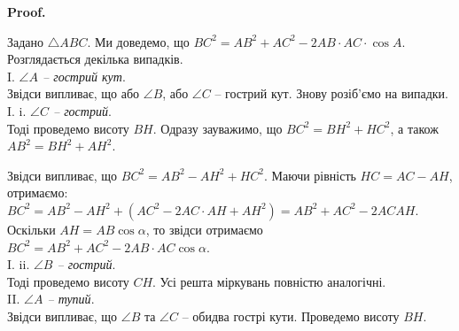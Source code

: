 \documentclass[a4paper, 10pt]{article}
\makeatletter
\theoremstyle{theoremdd}
\theoremstyle{theoremdd}
\theoremstyle{theoremdd}
\theoremstyle{theoremdd}
\theoremstyle{theoremdd}
\theoremstyle{theoremdd}
\theoremstyle{theoremdd}
\theoremstyle{theoremdd}
\theoremstyle{theoremdd}
\renewenvironment{proof}[1][Proof.\\]{\par
\pushQED{\hfill \qed}%
\normalfont \topsep6\p@\@plus6\p@\relax
\trivlist
\item\relax
{\bfseries
#1\@addpunct{.}}\hspace\labelsep\ignorespaces
}{%
\popQED\endtrivlist\@endpefalse
}
\makeatother
\begin{document}
\begin{proof}
Задано $\triangle ABC$. Ми доведемо, що $BC^2 = AB^2 + AC^2 - 2 AB \cdot AC \cdot \cos A$. Розглядається декілька випадків.
\bigskip \\
I. \textit{$\angle A$ -- гострий кут}.\\
Звідси випливає, що або $\angle B$, або $\angle C$ -- гострий кут. Знову розіб'ємо на випадки.\\
I. i. \textit{$\angle C$ -- гострий}.\\
Тоді проведемо висоту $BH$. Одразу зауважимо, що $BC^2 = BH^2 + HC^2$, а також $AB^2 = BH^2 + AH^2$.
\begin{figure}[H]
\centering
{}
\end{figure}
Звідси випливає, що $BC^2 = AB^2 - AH^2 + HC^2$. Маючи рівність $HC = AC - AH$, отримаємо:\\
$BC^2 = AB^2 - AH^2 + (AC^2 - 2 AC \cdot AH + AH^2) = AB^2 + AC^2 - 2 AC AH$.\\
Оскільки $AH = AB \cos \alpha$, то звідси отримаємо $BC^2 = AB^2 + AC^2 - 2 AB \cdot AC \cos \alpha$.\\
I. ii. \textit{$\angle B$ -- гострий}.\\
Тоді проведемо висоту $CH$. Усі решта міркувань повністю аналогічні.
\bigskip \\
II. \textit{$\angle A$ -- тупий}.\\
Звідси випливає, що $\angle B$ та $\angle C$ -- обидва гострі кути. Проведемо висоту $BH$.
\begin{figure}[H]
\centering
{}
\end{figure}
\end{proof}
\end{document}

